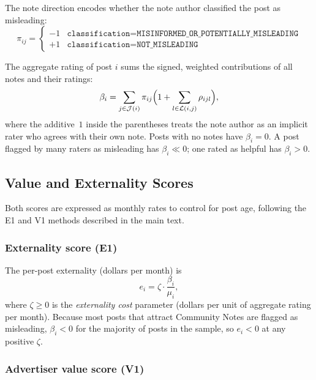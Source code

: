 \documentclass[11pt]{article}
\begin{document}
The note direction encodes whether the note author classified the post as misleading:
\begin{equation}
    \pi_{ij} =
    \begin{cases}
        -1 & \texttt{classification} = \texttt{MISINFORMED\_OR\_POTENTIALLY\_MISLEADING} \\
        +1 & \texttt{classification} = \texttt{NOT\_MISLEADING}
    \end{cases}
\end{equation}

The aggregate rating of post $i$ sums the signed, weighted contributions of all
notes and their ratings:
\begin{equation}
    \beta_i = \sum_{j \in \mathcal{J}(i)} \pi_{ij}
              \Bigl(1 + \sum_{l \in \mathcal{L}(i,j)} \rho_{ijl}\Bigr),
    \label{eq:beta}
\end{equation}
where the additive~$1$ inside the parentheses treats the note author as an
implicit rater who agrees with their own note.  Posts with no notes have
$\beta_i = 0$.  A post flagged by many raters as misleading has $\beta_i \ll 0$;
one rated as helpful has $\beta_i > 0$.

\subsection{Value and Externality Scores}
\label{sec:scores}

Both scores are expressed as monthly rates to control for post age,
following the E1 and V1 methods described in the main text.

\subsubsection*{Externality score (E1)}

The per-post externality (dollars per month) is
\begin{equation}
    e_i = \zeta \cdot \frac{\beta_i}{\mu_i},
    \label{eq:e_score}
\end{equation}
where $\zeta \geq 0$ is the \emph{externality cost} parameter (dollars per unit of
aggregate rating per month).  Because most posts that attract Community Notes are
flagged as misleading, $\beta_i < 0$ for the majority of posts in the sample, so
$e_i < 0$ at any positive $\zeta$.

\subsubsection*{Advertiser value score (V1)}
\end{document}
